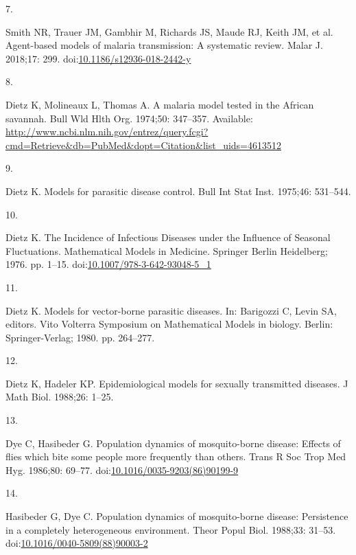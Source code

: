\documentclass[
]{book}
\newlength{\cslhangindent}
\newlength{\csllabelwidth}
\newlength{\cslentryspacingunit} %
\newenvironment{CSLReferences}[2] %
 {%
  \setlength{\parindent}{0pt}
  \ifodd #1
  \let\oldpar\par
  \def\par{\hangindent=\cslhangindent\oldpar}
  \fi
  \setlength{\parskip}{#2\cslentryspacingunit}
 }%
 {}
\newcommand{\CSLLeftMargin}[1]{\parbox[t]{\csllabelwidth}{#1}}
\newcommand{\CSLRightInline}[1]{\parbox[t]{\linewidth - \csllabelwidth}{#1}\break}
\begin{document}
\begin{CSLReferences}{0}{0}
\leavevmode{}%
\CSLLeftMargin{7. }%
\CSLRightInline{Smith NR, Trauer JM, Gambhir M, Richards JS, Maude RJ, Keith JM, et al. Agent-based models of malaria transmission: {A} systematic review. Malar J. 2018;17: 299. doi:\href{https://doi.org/10.1186/s12936-018-2442-y}{10.1186/s12936-018-2442-y}}

\leavevmode{}%
\CSLLeftMargin{8. }%
\CSLRightInline{Dietz K, Molineaux L, Thomas A. A malaria model tested in the {African} savannah. Bull Wld Hlth Org. 1974;50: 347--357. Available: \url{http://www.ncbi.nlm.nih.gov/entrez/query.fcgi?cmd=Retrieve\&db=PubMed\&dopt=Citation\&list_uids=4613512}}

\leavevmode{}%
\CSLLeftMargin{9. }%
\CSLRightInline{Dietz K. Models for parasitic disease control. Bull Int Stat Inst. 1975;46: 531--544. }

\leavevmode{}%
\CSLLeftMargin{10. }%
\CSLRightInline{Dietz K. The {Incidence} of {Infectious Diseases} under the {Influence} of {Seasonal Fluctuations}. Mathematical {Models} in {Medicine}. {Springer Berlin Heidelberg}; 1976. pp. 1--15. doi:\href{https://doi.org/10.1007/978-3-642-93048-5_1}{10.1007/978-3-642-93048-5\_1}}

\leavevmode{}%
\CSLLeftMargin{11. }%
\CSLRightInline{Dietz K. Models for vector-borne parasitic diseases. In: Barigozzi C, Levin SA, editors. Vito {Volterra Symposium} on {Mathematical Models} in biology. {Berlin}: {Springer-Verlag}; 1980. pp. 264--277. }

\leavevmode{}%
\CSLLeftMargin{12. }%
\CSLRightInline{Dietz K, Hadeler KP. Epidemiological models for sexually transmitted diseases. J Math Biol. 1988;26: 1--25. }

\leavevmode{}%
\CSLLeftMargin{13. }%
\CSLRightInline{Dye C, Hasibeder G. Population dynamics of mosquito-borne disease: Effects of flies which bite some people more frequently than others. Trans R Soc Trop Med Hyg. 1986;80: 69--77. doi:\href{https://doi.org/10.1016/0035-9203(86)90199-9}{10.1016/0035-9203(86)90199-9}}

\leavevmode{}%
\CSLLeftMargin{14. }%
\CSLRightInline{Hasibeder G, Dye C. Population dynamics of mosquito-borne disease: Persistence in a completely heterogeneous environment. Theor Popul Biol. 1988;33: 31--53. doi:\href{https://doi.org/10.1016/0040-5809(88)90003-2}{10.1016/0040-5809(88)90003-2}}


\end{CSLReferences}
\end{document}
